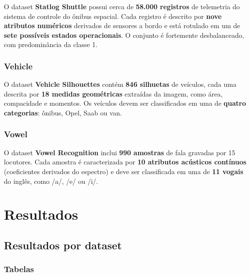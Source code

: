 \documentclass{article}
\begin{document}
O dataset \textbf{Statlog Shuttle} possui cerca de \textbf{58.000 registros} de telemetria do sistema de controle do ônibus espacial. Cada registro é descrito por \textbf{nove atributos numéricos} derivados de sensores a bordo e está rotulado em um de \textbf{sete possíveis estados operacionais}. O conjunto é fortemente desbalanceado, com predominância da classe 1.

\subsubsection{Vehicle}

O dataset \textbf{Vehicle Silhouettes} contém \textbf{846 silhuetas} de veículos, cada uma descrita por \textbf{18 medidas geométricas} extraídas da imagem, como área, compacidade e momentos. Os veículos devem ser classificados em uma de \textbf{quatro categorias}: ônibus, Opel, Saab ou van.

\subsubsection{Vowel}

O dataset \textbf{Vowel Recognition} inclui \textbf{990 amostras} de fala gravadas por 15 locutores. Cada amostra é caracterizada por \textbf{10 atributos acústicos contínuos} (coeficientes derivados do espectro) e deve ser classificada em uma de \textbf{11 vogais} do inglês, como /a/, /e/ ou /i/.

\section{Resultados}

\subsection{Resultados por dataset}

\subsubsection{Tabelas}
\end{document}
